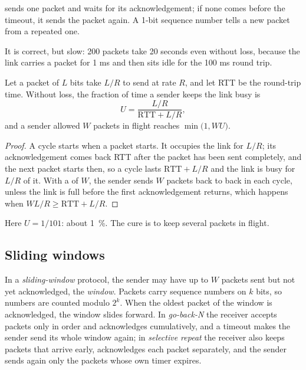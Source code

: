  sends one packet and waits for its acknowledgement; if none comes before the timeout, it sends the
packet again. A 1-bit sequence number tells a new packet from a repeated one.


\label{out:b2:transport-layer:sw}

It is correct, but slow: 200 packets take 20 seconds even without loss, because the link carries a packet for 1 ms
and then sits idle for the 100 ms round trip.

\begin{proposition}[Utilisation]\label{prop:b2:transport-layer:utilisation}
Let a packet of $L$ bits take $L/R$ to send at rate $R$, and let RTT be the round-trip time. Without loss, the
fraction of time a  sender keeps the link busy is
\[
U = \frac{L/R}{\mathrm{RTT} + L/R} ,
\]
and a sender allowed $W$ packets in flight reaches $\min\bigl(1, W U\bigr)$.
\end{proposition}

\begin{proof}
A cycle starts when a packet starts. It occupies the link for $L/R$; its acknowledgement comes back RTT after the
packet has been sent completely, and the next packet starts then, so a cycle lasts $\mathrm{RTT} + L/R$ and the link
is busy for $L/R$ of it. With a  of $W$, the sender sends $W$ packets back to back in each cycle, unless the
link is full before the first acknowledgement returns, which happens when $W L/R \ge \mathrm{RTT} + L/R$.
\end{proof}

Here $U = 1/101$: about 1~\%. The cure is to keep several packets in flight.

\subsection{Sliding windows}

\begin{definition}\label{def:b2:transport-layer:window}
In a \emph{sliding-window} protocol, the sender may have up to $W$ packets sent but not yet
acknowledged, the \emph{window}. Packets carry sequence numbers on $k$ bits, so numbers are counted modulo $2^k$. When
the oldest packet of the window is acknowledged, the window slides forward. In \emph{go-back-N} the receiver accepts packets only in
order and acknowledges cumulatively, and a timeout makes the sender send its whole window again; in
\emph{selective repeat} the receiver also keeps packets that arrive early, acknowledges
each packet separately, and the sender sends again only the packets whose own timer expires.
\end{definition}

